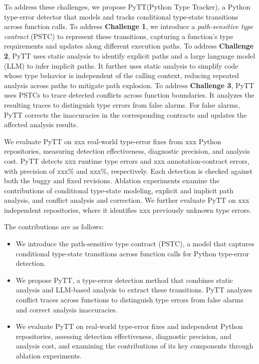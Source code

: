 To address these challenges, we propose PyTT(Python Type Tracker), a Python type-error detector
that models and tracks conditional type-state transitions across function
calls. To address \textbf{Challenge 1}, we introduce a
\emph{path-sensitive type contract} (PSTC) to represent these transitions,
capturing a function's type requirements and updates along different
execution paths. To address \textbf{Challenge 2}, PyTT uses static analysis
to identify explicit paths and a large language model (LLM) to infer
implicit paths. It further uses static analysis to
simplify code whose type behavior is independent of the calling context,
reducing repeated analysis across paths to mitigate path explosion.
To address \textbf{Challenge 3}, PyTT uses PSTCs to trace detected conflicts
across function boundaries. It analyzes the resulting traces to distinguish
type errors from false alarms. For false alarms, PyTT corrects the
inaccuracies in the corresponding contracts and updates the affected
analysis results.

We evaluate PyTT on xxx real-world type-error fixes from xxx Python
repositories, measuring detection effectiveness, diagnostic precision,
and analysis cost. PyTT detects xxx runtime type errors and xxx
annotation-contract errors, with precision of xxx\% and xxx\%, respectively.
Each detection is checked against both the buggy and fixed revisions.
Ablation experiments examine the contributions of conditional type-state
modeling, explicit and implicit path analysis, and conflict analysis and
correction. We further evaluate PyTT on xxx independent repositories,
where it identifies xxx previously unknown type errors.

The contributions are as follows:
\begin{itemize}
  \item We introduce the path-sensitive type contract (PSTC), a model
  that captures conditional type-state transitions across function calls
  for Python type-error detection.
  \item We propose PyTT, a type-error detection method that combines
  static analysis and LLM-based analysis to extract these transitions.
  PyTT analyzes conflict traces across functions to distinguish type
  errors from false alarms and correct analysis inaccuracies.
  \item We evaluate PyTT on real-world type-error fixes and independent
  Python repositories, assessing detection effectiveness, diagnostic
  precision, and analysis cost, and examining the contributions of its
  key components through ablation experiments.
\end{itemize}
